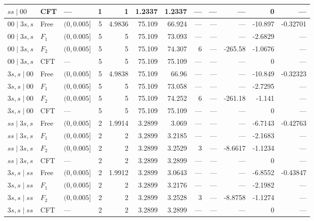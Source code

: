 \begin{longtable}{lllrrrrrrrrr}
$ss\mid 00$ & CFT & --- & 1 & 1 & 1.2337 & 1.2337 & --- & --- & --- & 0 & ---\\
\midrule
$00\mid 3s,s$ & Free & $(0,0.005]$ & 5 & 4.9836 & 75.109 & 66.924 & --- & --- & --- & -10.897 & -0.32701\\*
$00\mid 3s,s$ & $F_1$ & $(0,0.005]$ & 5 & 5 & 75.109 & 73.093 & --- & --- & --- & -2.6829 & ---\\*
$00\mid 3s,s$ & $F_2$ & $(0,0.005]$ & 5 & 5 & 75.109 & 74.307 & 6 & --- & -265.58 & -1.0676 & ---\\*
$00\mid 3s,s$ & CFT & --- & 5 & 5 & 75.109 & 75.109 & --- & --- & --- & 0 & ---\\
\midrule
$3s,s\mid 00$ & Free & $(0,0.005]$ & 5 & 4.9838 & 75.109 & 66.96 & --- & --- & --- & -10.849 & -0.32323\\*
$3s,s\mid 00$ & $F_1$ & $(0,0.005]$ & 5 & 5 & 75.109 & 73.058 & --- & --- & --- & -2.7295 & ---\\*
$3s,s\mid 00$ & $F_2$ & $(0,0.005]$ & 5 & 5 & 75.109 & 74.252 & 6 & --- & -261.18 & -1.141 & ---\\*
$3s,s\mid 00$ & CFT & --- & 5 & 5 & 75.109 & 75.109 & --- & --- & --- & 0 & ---\\
\midrule
$ss\mid 3s,s$ & Free & $(0,0.005]$ & 2 & 1.9914 & 3.2899 & 3.069 & --- & --- & --- & -6.7143 & -0.42763\\*
$ss\mid 3s,s$ & $F_1$ & $(0,0.005]$ & 2 & 2 & 3.2899 & 3.2185 & --- & --- & --- & -2.1683 & ---\\*
$ss\mid 3s,s$ & $F_2$ & $(0,0.005]$ & 2 & 2 & 3.2899 & 3.2529 & 3 & --- & -8.6617 & -1.1234 & ---\\*
$ss\mid 3s,s$ & CFT & --- & 2 & 2 & 3.2899 & 3.2899 & --- & --- & --- & 0 & ---\\
\midrule
$3s,s\mid ss$ & Free & $(0,0.005]$ & 2 & 1.9912 & 3.2899 & 3.0643 & --- & --- & --- & -6.8552 & -0.43847\\*
$3s,s\mid ss$ & $F_1$ & $(0,0.005]$ & 2 & 2 & 3.2899 & 3.2176 & --- & --- & --- & -2.1982 & ---\\*
$3s,s\mid ss$ & $F_2$ & $(0,0.005]$ & 2 & 2 & 3.2899 & 3.2528 & 3 & --- & -8.8758 & -1.1274 & ---\\*
$3s,s\mid ss$ & CFT & --- & 2 & 2 & 3.2899 & 3.2899 & --- & --- & --- & 0 & ---\\
\end{longtable}
\endgroup
